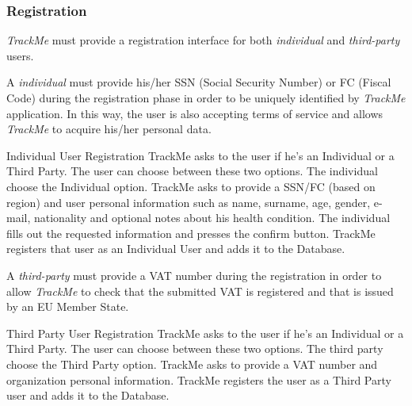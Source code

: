 \documentclass[a4paper]{article}
\begin{document}
        \subsubsection{Registration}
        \textit{TrackMe} must provide a registration interface for both \textit{individual} and \textit{third-party} users.
        
        A  \textit{individual} must provide his/her SSN (Social Security Number) or FC (Fiscal Code) during the registration phase in order to be uniquely identified by \textit{TrackMe} application. In this way, the user is also accepting terms of service and allows \textit{TrackMe} to acquire his/her personal data.
        \begin{usecase}{Individual User Registration}
              {TrackMe asks to the user if he's an Individual or a Third Party. The user can choose between these two options.}
              {The individual choose the Individual option.}
              {TrackMe asks to provide a SSN/FC (based on region) and user personal information such as name, surname, age, gender, e-mail, nationality and optional notes about his health condition.}
              {The individual fills out the requested information and presses the confirm button.}
              {TrackMe registers that user as an Individual User and adds it to the  Database.}
        \end{usecase}
        
        A \textit{third-party} must provide a VAT number during the registration in order to allow \textit{TrackMe} to check that the submitted VAT is registered and that is issued by an EU Member State.
        
        \begin{usecase}{Third Party User Registration}
              {TrackMe asks to the user if he's an Individual or a Third Party. The user can choose between these two options.}
              {The third party choose the Third Party option.}
              {TrackMe asks to provide a VAT number and organization personal information.}
              {TrackMe registers the user as a Third Party user and adds it to the Database.}
        \end{usecase}
        
\end{document}
